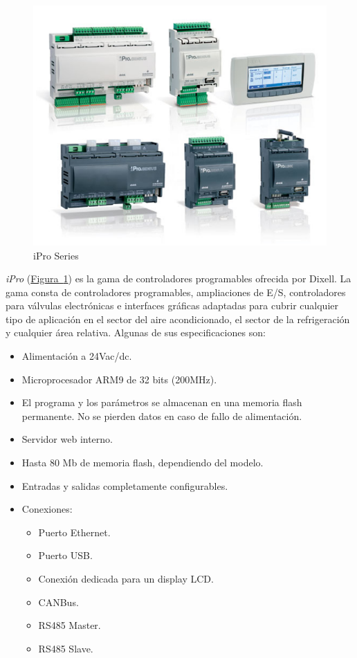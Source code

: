 \begin{figure}[h]
  \centering
  \includegraphics[width=12cm, keepaspectratio]{img/iproSeries}
  \caption{iPro Series}
  \label{figura:iproSeries}
\end{figure}

\textit{iPro} (\hyperref[figura:iproSeries]{Figura~\ref{figura:iproSeries}}) es la gama de controladores programables ofrecida por Dixell. La gama consta de controladores programables, ampliaciones de E/S, controladores para válvulas electrónicas e interfaces gráficas adaptadas para cubrir cualquier tipo de aplicación en el sector del aire acondicionado, el sector de la refrigeración y cualquier área relativa. Algunas de sus especificaciones son:

\begin{itemize}
  \item Alimentación a 24Vac/dc.
  \item Microprocesador ARM9 de 32 bits (200MHz).
  \item El programa y los parámetros se almacenan en una memoria flash permanente. No se pierden datos en caso de fallo de alimentación.
  \item Servidor web interno.
  \item Hasta 80 Mb de memoria flash, dependiendo del modelo.
  \item Entradas y salidas completamente configurables.
  \item Conexiones:
  \begin{itemize}
    \item Puerto Ethernet.
    \item Puerto USB.
    \item Conexión dedicada para un display LCD.
    \item CANBus.
    \item RS485 Master.
    \item RS485 Slave.
  \end{itemize}
\end{itemize}

